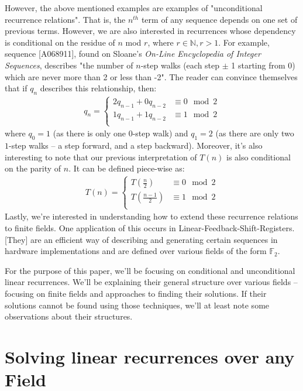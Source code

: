 \documentclass[a4paper]{article}
\theoremstyle{definition}
\begin{document}
However, the above mentioned examples are examples of "unconditional recurrence relations". That is, the $n^{th}$ term of any sequence depends on one set of previous terms. However, we are also interested in recurrences whose dependency is conditional on the residue of $n$ mod $r$, where $r\in \mathbb{N}, r>1$. For example, sequence [A068911], found on Sloane's \textit{On-Line Encyclopedia of Integer Sequences}, describes "the number of $n$-step walks (each step $\pm$ 1 starting from 0) which are never more than 2 or less than -2"\cite{bib:gen_cond_rec}. The reader can convince themselves that if $q_n$ describes this relationship, then:
\begin{align*}
q_n=
\begin{cases}
2q_{n-1}+0q_{n-2} & \equiv 0 \mod 2 \\
1q_{n-1}+1q_{n-2} & \equiv 1 \mod 2 \\
\end{cases}
\end{align*}
where $q_0=1$ (as there is only one $0$-step walk) and $q_1=2$ (as there are only two $1$-step walks -- a step forward, and a step backward). Moreover, it's also interesting to note that our previous interpretation of $T(n)$ is also conditional on the parity of $n$. It can be defined piece-wise as:
\begin{align*}
T(n)=
\begin{cases}
T\left(\frac{n  }{2}\right) & \equiv 0 \mod 2 \\
T\left(\frac{n-1}{2}\right) & \equiv 1 \mod 2 \\
\end{cases}
\end{align*}
Lastly, we're interested in understanding how to extend these recurrence relations to finite fields. One application of this occurs in Linear-Feedback-Shift-Registers. [They] are an efficient way of describing and generating certain sequences in hardware implementations \cite{bib:lfsr} and are defined over various fields of the form $\mathbb{F}_{2}$.  

For the purpose of this paper, we'll be focusing on conditional and unconditional linear recurrences. We'll be explaining their general structure over various fields -- focusing on finite fields and approaches to finding their solutions. If their solutions cannot be found using those techniques, we'll at least note some observations about their structures.

\section{Solving linear recurrences over any Field}
\end{document}
